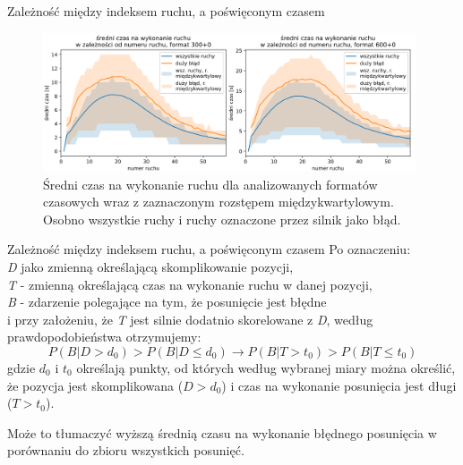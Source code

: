 \documentclass{beamer}
\begin{document}
\begin{frame}{Zależność między indeksem ruchu, a poświęconym czasem}
	\begin{figure}[H]
		\centering
		\includegraphics[width=11cm]{../Formatka/sr_czas_na_ruch.png}
		\caption{Średni czas na wykonanie ruchu dla analizowanych formatów czasowych wraz z zaznaczonym rozstępem międzykwartylowym. Osobno wszystkie ruchy i ruchy oznaczone przez silnik jako błąd.}
		\label{rys:sr_czas_na_ruch}
	\end{figure}
\end{frame}

\begin{frame}{Zależność między indeksem ruchu, a poświęconym czasem}
	Po oznaczeniu:\\ 
	\textit{D} jako zmienną określającą skomplikowanie pozycji,\\ \textit{T} - zmienną określającą czas na wykonanie ruchu w danej pozycji,\\ \textit{B} - zdarzenie polegające na tym, że posunięcie jest błędne\\
	 i przy założeniu, że \textit{T} jest silnie dodatnio skorelowane z \textit{D}, według prawdopodobieństwa otrzymujemy:
	\begin{equation*}
		P(B|D>d_0) > P(B|D\leq d_0) \rightarrow P(B|T>t_0) > P(B|T\leq t_0)
	\end{equation*}
	gdzie $d_0$ i $t_0$ określają punkty, od których według wybranej miary można określić, że pozycja jest skomplikowana ($D>d_0$) i czas na wykonanie posunięcia jest długi ($T>t_0$).
	
	
	Może to tłumaczyć wyższą średnią czasu na wykonanie błędnego posunięcia w porównaniu do zbioru wszystkich posunięć.
\end{frame}
\end{document}
